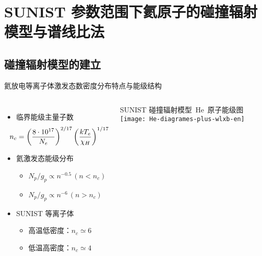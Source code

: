 \section{SUNIST 参数范围下氦原子的碰撞辐射模型与谱线比法}

\subsection{碰撞辐射模型的建立}

%

\begin{frame}{氦放电等离子体激发态数密度分布特点与能级结构}
	\begin{columns}
			\begin{itemize}
				\item 临界能级主量子数\\ 
					\[
					\hspace{-1em}
					n_c=\left(\frac{8\cdot10^{17}}{N_e}\right)^{2/17}
        			\left(\frac{kT_e}{\chi_H}\right)^{1/17}
        			\]
        		\item 氦激发态能级分布\\ 
        			\begin{itemize}
						\item $N_p/g_p\propto n^{-0.5}\,(n<n_c)$
						\item $N_p/g_p\propto n^{-6}\,(n>n_c)$
					\end{itemize}
				\item SUNIST 等离子体
					\begin{itemize}
						\item 高温低密度：$n_c\simeq 6$
						\item 低温高密度：$n_c\simeq 4$
					\end{itemize}
			\end{itemize}
			\centering
			SUNIST 碰撞辐射模型~He~原子能级图\\[1em]
			\texttt{[image: He-diagrames-plus-wlxb-en]}
	\end{columns}
\end{frame}

